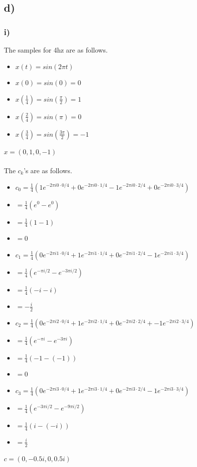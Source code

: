 \subsection*{d)}
\subsubsection*{i)}
The samples for 4hz are as follows.
\begin{itemize}[leftmargin=*]
  \item[] \(x(t) = sin(2 \pi t)\)
  \item[] \(x(0) = sin(0) = 0\)
  \item[] \(x(\frac{1}{4}) = sin(\frac{\pi}{2}) = 1\)
  \item[] \(x(\frac{2}{4}) = sin(\pi) = 0\)
  \item[] \(x(\frac{3}{4}) = sin(\frac{3 \pi}{2}) = -1\)
\end{itemize}
\(x = (0, 1, 0, -1)\)\\\\
The \(c_k\)'s are as follows.
\begin{itemize}[leftmargin=*]
  \item[] \(c_0 = \frac{1}{4} (1 e^{-2 \pi i 0 \cdot 0 / 4} + 0 e^{-2 \pi i 0 \cdot 1 / 4} -1 e^{-2 \pi i 0 \cdot 2 / 4} + 0 e^{-2 \pi i 0 \cdot 3 / 4})\)
  \item[] \(= \frac{1}{4} (e^0 - e^0)\)
  \item[] \(= \frac{1}{4} (1 - 1)\)
  \item[] \(= 0\)
\end{itemize}
\begin{itemize}[leftmargin=*]
  \item[] \(c_1 = \frac{1}{4} (0 e^{-2 \pi i 1 \cdot 0 / 4} + 1 e^{-2 \pi i 1 \cdot 1 / 4} + 0 e^{-2 \pi i 1 \cdot 2 / 4} - 1 e^{-2 \pi i 1 \cdot 3 / 4})\)
  \item[] \(= \frac{1}{4} (e^{-\pi i / 2} - e^{-3 \pi i / 2})\)
  \item[] \(= \frac{1}{4} (-i - i)\)
  \item[] \(= -\frac{i}{2}\)
\end{itemize}
\begin{itemize}[leftmargin=*]
  \item[] \(c_2 = \frac{1}{4} (0 e^{-2 \pi i 2 \cdot 0 / 4} + 1 e^{-2 \pi i 2 \cdot 1 / 4} + 0 e^{-2 \pi i 2 \cdot 2 / 4} + -1 e^{-2 \pi i 2 \cdot 3 / 4})\)
  \item[] \(= \frac{1}{4} (e^{-\pi i} - e^{-3 \pi i})\)
  \item[] \(= \frac{1}{4} (-1 - (-1))\)
  \item[] \(= 0\)
\end{itemize}
\begin{itemize}[leftmargin=*]
  \item[] \(c_3 = \frac{1}{4} (0 e^{-2 \pi i 3 \cdot 0 / 4} + 1 e^{-2 \pi i 3 \cdot 1 / 4} + 0 e^{-2 \pi i 3 \cdot 2 / 4} - 1 e^{-2 \pi i 3 \cdot 3 / 4})\)
  \item[] \(= \frac{1}{4} (e^{-3 \pi i / 2} - e^{-9 \pi i / 2})\)
  \item[] \(= \frac{1}{4} (i - (-i))\)
  \item[] \(= \frac{i}{2}\)
\end{itemize}
\(c = (0, -0.5i, 0, 0.5i)\)

